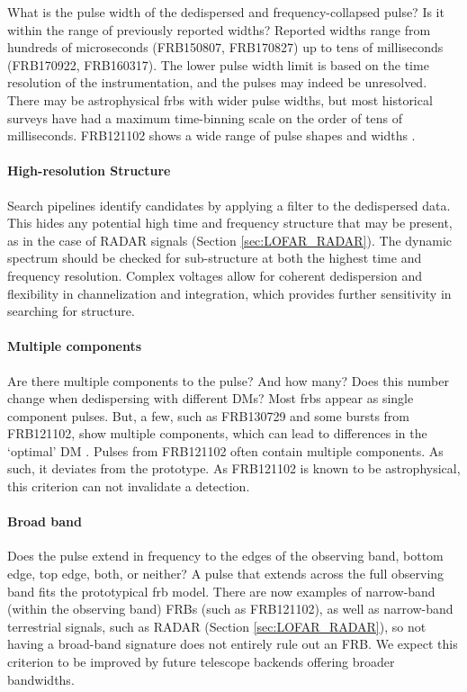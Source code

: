 \documentclass[a4paper,fleqn,usenatbib]{mnras}
\begin{document}
What is the pulse width of the dedispersed and frequency-collapsed pulse? Is it
within the range of previously reported widths? Reported widths range from
hundreds of microseconds (FRB150807, FRB170827) up to tens of milliseconds
(FRB170922, FRB160317). The lower pulse width limit is based on the time
resolution of the instrumentation, and the pulses may indeed be unresolved.
There may be astrophysical \glspl{frb} with wider pulse widths, but most
historical surveys have had a maximum time-binning scale on the order of tens of
milliseconds. FRB121102 shows a wide range of pulse shapes and widths
\citep{2018Natur.553..182M,atel10675}.

\paragraph{High-resolution Structure}

Search pipelines identify candidates by applying a filter to the dedispersed
data. This hides any potential high time and frequency structure that may be
present, as in the case of RADAR signals (Section \ref{sec:LOFAR_RADAR}). The
dynamic spectrum should be checked for sub-structure at both the highest time
and frequency resolution. Complex voltages allow for coherent dedispersion and
flexibility in channelization and integration, which provides further
sensitivity in searching for structure.

\paragraph{Multiple components}

Are there multiple components to the pulse? And how many? Does this number
change when dedispersing with different DMs? Most \glspl{frb} appear as single
component pulses. But, a few, such as FRB130729 and some bursts from FRB121102,
show multiple components, which can lead to differences in the `optimal' DM
\citep{2018Natur.553..182M}. Pulses from FRB121102 often contain multiple
components. As such, it deviates from the prototype. As FRB121102 is known to
be astrophysical, this criterion can not invalidate a detection.

\paragraph{Broad band}

Does the pulse extend in frequency to the edges of the observing band, bottom
edge, top edge, both, or neither? A pulse that extends across the full observing
band fits the prototypical \gls{frb} model. There are now examples of
narrow-band (within the observing band) FRBs (such as FRB121102), as well as
narrow-band terrestrial signals, such as RADAR (Section \ref{sec:LOFAR_RADAR}),
so not having a broad-band signature does not entirely rule out an FRB.  We
expect this criterion to be improved by future telescope backends offering
broader bandwidths. 
\end{document}

